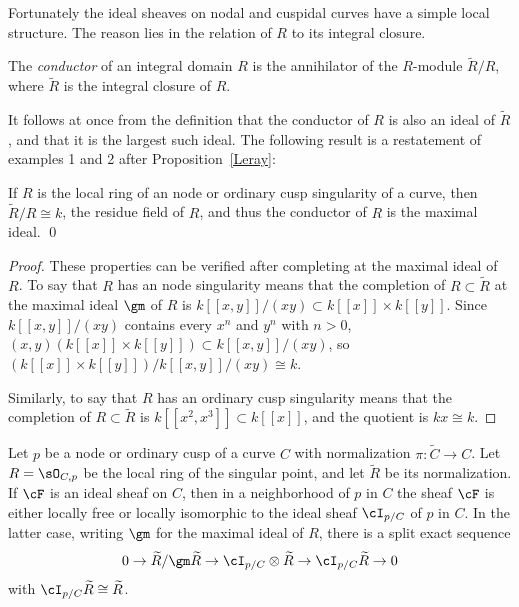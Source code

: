 Fortunately the ideal sheaves on nodal and cuspidal curves have a simple local structure. The reason lies in the relation of $R$ to its integral closure. 

\begin{definition}
The \emph{conductor} of an integral domain $R$ is the annihilator of the $R$-module
$\widetilde R/R$, where $\widetilde R$ is the integral closure of $R$.
\end{definition}

It follows at once from the definition that the conductor of $R$ is also an ideal of $\widetilde R$, and that it is the largest such ideal. The following result is a restatement of examples 1 and 2 after Proposition~\ref{Leray}:

\begin{proposition}\label{conductor of node and cusp}
If $R$ is the local ring of an node or ordinary cusp singularity of a curve, then  $\widetilde R/R \cong k$, the residue field of $R$, and thus the conductor of $R$ is the
maximal ideal. \qed
\end{proposition}

\begin{proof} These properties can be verified after completing at the maximal ideal of $R$.
To say that $R$ has an node singularity means that the completion of $R \subset \widetilde R$ at the maximal ideal $\gm$ of $R$ is $k[[x,y]]/(xy)\subset k[[x]]\times k[[y]]$. Since  $k[[x,y]]/(xy)$ contains every $x^n$ and $y^n$ with $n>0$,
$(x,y) (k[[x]]\times k[[y]]) \subset k[[x,y]]/(xy)$, so 
$(k[[x]]\times k[[y]])/ k[[x,y]]/(xy) \cong k$.

Similarly, to say that $R$ has an ordinary cusp singularity means that the completion of 
$R \subset \widetilde R$ is $k[[x^2,x^3]]\subset k[[x]]$, and the quotient is $kx \cong k$.
\end{proof}


\begin{theorem}\label{torsion free at node}
Let $p$ be a node or ordinary cusp of a curve $C$ with normalization $\pi: \widetilde C \to C$. Let $R = \sO_{C,p}$ be the local ring of the singular point,
and let $\widetilde R$ be its normalization.  If $\cF$ is an ideal sheaf on $C$, then in a neighborhood of $p$ in $C$ the sheaf $\cF$ is either locally free or locally isomorphic to the ideal sheaf $\cI_{p/C}$ of $p$ in $C$. In the latter case,
writing $\gm$ for the maximal ideal of $R$,
there is a split exact sequence
$$
0\to \widetilde R/\gm \widetilde R \to \cI_{p/C} \otimes \widetilde R  \to \cI_{p/C} \widetilde R\to 0
$$
with $\cI_{p/C} \widetilde R \cong \widetilde R$.
\end{theorem}

